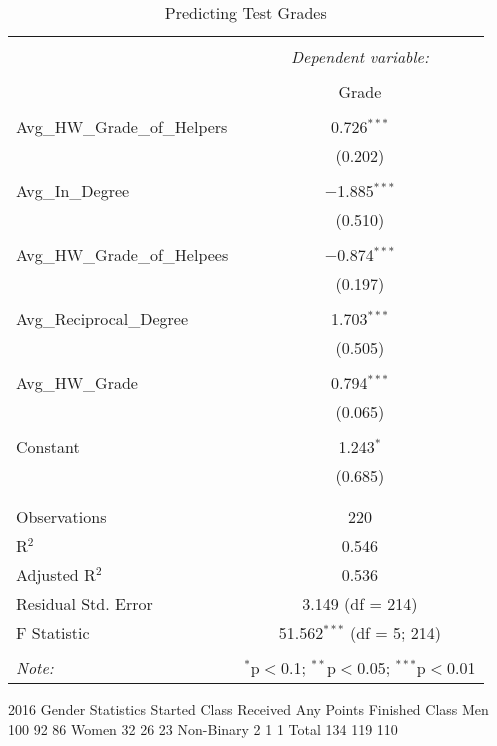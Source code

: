 \documentclass[a4paper]{article}
\begin{document}
\begin{table}[!htbp] \centering 
  \caption{Predicting Test Grades} 
  \label{} 
\begin{tabular}{@{\extracolsep{5pt}}lc} 
\\[-1.8ex]\hline 
\hline \\[-1.8ex] 
 & \multicolumn{1}{c}{\textit{Dependent variable:}} \\ 
\cline{2-2} 
\\[-1.8ex] & Grade \\ 
\hline \\[-1.8ex] 
Avg\_HW\_Grade\_of\_Helpers & 0.726$^{***}$ \\ 
  & (0.202) \\ 
  & \\ 
 Avg\_In\_Degree & $-$1.885$^{***}$ \\ 
  & (0.510) \\ 
  & \\ 
 Avg\_HW\_Grade\_of\_Helpees & $-$0.874$^{***}$ \\ 
  & (0.197) \\ 
  & \\ 
 Avg\_Reciprocal\_Degree & 1.703$^{***}$ \\ 
  & (0.505) \\ 
  & \\ 
 Avg\_HW\_Grade & 0.794$^{***}$ \\ 
  & (0.065) \\ 
  & \\ 
 Constant & 1.243$^{*}$ \\ 
  & (0.685) \\ 
  & \\ 
\hline \\[-1.8ex] 
Observations & 220 \\ 
R$^{2}$ & 0.546 \\ 
Adjusted R$^{2}$ & 0.536 \\ 
Residual Std. Error & 3.149 (df = 214) \\ 
F Statistic & 51.562$^{***}$ (df = 5; 214) \\ 
\hline 
\hline \\[-1.8ex] 
\textit{Note:}  & \multicolumn{1}{r}{$^{*}$p$<$0.1; $^{**}$p$<$0.05; $^{***}$p$<$0.01} \\ 
\end{tabular} 
\end{table} 


2016 Gender Statistics
Started Class
Received Any Points
Finished Class
Men
100
92
86
Women
32
26
23
Non-Binary
2
1
1
Total
134
119
110
\end{document}
